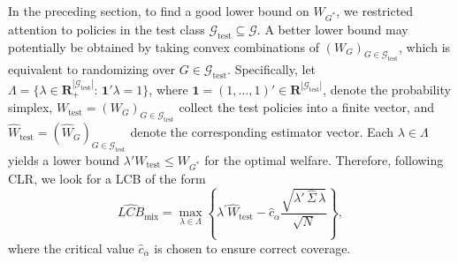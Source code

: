 \documentclass[12pt]{article}
\numberwithin{equation}{section}
\theoremstyle{plain}                         %
\theoremstyle{definition}                  %
\theoremstyle{remark}                      %
\begin{document}
In the preceding section, to find a good lower bound on $W_{G^*}$, we restricted attention to policies in the test class $\mathcal{G}_{\text{test}} \subseteq \mathcal{G}$. A better lower bound may potentially be obtained by taking convex combinations of $(W_G)_{G \in \mathcal{G}_{\text{test}}}$, which is equivalent to randomizing over $G \in \mathcal{G}_{\text{test}}$. Specifically, let $\Lambda = \bigl\{\lambda\in \mathbf{R}^{|\mathcal{G}_{\text{test}}|}_+:\,\mathbf{1}'\lambda=1\bigr\}$, where $\mathbf{1}=(1,\ldots,1)'\in \mathbf{R}^{|\mathcal{G}_{\text{test}}|}$, denote the probability simplex, $W_{\text{test}} = (W_G)_{G \in \mathcal{G}_{\text{test}}}$ collect the test policies into a finite vector, and $\widehat{W}_{\text{test}} = (\widehat{W}_G)_{G \in \mathcal{G}_{\text{test}}}$ denote the corresponding estimator vector. Each $\lambda \in \Lambda$ yields a lower bound  $\lambda'W_{\text{test}}\leq W_{G^*}$ for the optimal welfare. Therefore, following CLR, we look for a LCB of the form 
\begin{equation} \label{eq:lcbqlrmain}
\widehat{LCB}_{\text{mix}} = \max_{\lambda\in\Lambda} \left\{ \lambda^{\prime} \widehat{W}_{\text{test}} - \hat{c}_{\alpha} \frac{\sqrt{\lambda'\,\widehat\Sigma\,\lambda}}{\sqrt{N}} \right\},
\end{equation}
where the critical value $\hat{c}_{\alpha}$ is chosen to ensure correct coverage. 
\end{document}

